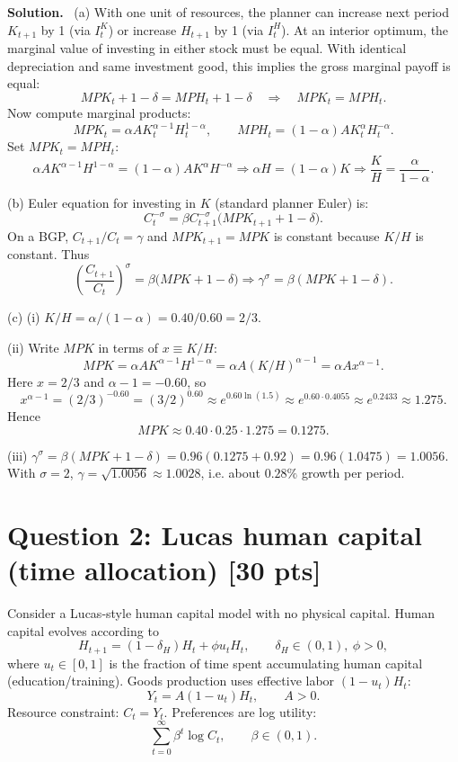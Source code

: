 \documentclass[12pt]{article}
\newenvironment{sol}{\par\medskip\noindent\textbf{Solution.}\ }{\par\medskip}
\newcommand{\pts}[1]{\hfill{\small[#1 pts]}}
\begin{document}
\begin{sol}
(a) With one unit of resources, the planner can increase next period \(K_{t+1}\) by 1 (via \(I^K_t\)) or increase \(H_{t+1}\) by 1 (via \(I^H_t\)).
At an interior optimum, the marginal value of investing in either stock must be equal.
With identical depreciation and same investment good, this implies the gross marginal payoff is equal:
\[
MPK_t + 1-\delta = MPH_t + 1-\delta \quad\Rightarrow\quad MPK_t=MPH_t.
\]
Now compute marginal products:
\[
MPK_t = \alpha A K_t^{\alpha-1}H_t^{1-\alpha},\qquad
MPH_t = (1-\alpha)A K_t^{\alpha}H_t^{-\alpha}.
\]
Set \(MPK_t=MPH_t\):
\[
\alpha A K^{\alpha-1}H^{1-\alpha}=(1-\alpha)A K^\alpha H^{-\alpha}
\Rightarrow \alpha H = (1-\alpha)K
\Rightarrow \frac{K}{H}=\frac{\alpha}{1-\alpha}.
\]

(b) Euler equation for investing in \(K\) (standard planner Euler) is:
\[
C_t^{-\sigma} = \beta C_{t+1}^{-\sigma}\big(MPK_{t+1}+1-\delta\big).
\]
On a BGP, \(C_{t+1}/C_t=\gamma\) and \(MPK_{t+1}=MPK\) is constant because \(K/H\) is constant.
Thus
\[
\left(\frac{C_{t+1}}{C_t}\right)^\sigma = \beta\big(MPK+1-\delta\big)
\Rightarrow \gamma^\sigma = \beta(MPK+1-\delta).
\]

(c)
(i) \(K/H=\alpha/(1-\alpha)=0.40/0.60=2/3\).

(ii) Write \(MPK\) in terms of \(x\equiv K/H\):
\[
MPK = \alpha A K^{\alpha-1}H^{1-\alpha}
= \alpha A (K/H)^{\alpha-1}
= \alpha A x^{\alpha-1}.
\]
Here \(x=2/3\) and \(\alpha-1=-0.60\), so
\[
x^{\alpha-1}=(2/3)^{-0.60}=(3/2)^{0.60}\approx e^{0.60\ln(1.5)}\approx e^{0.60\cdot 0.4055}\approx e^{0.2433}\approx 1.275.
\]
Hence
\[
MPK \approx 0.40\cdot 0.25 \cdot 1.275 = 0.1275.
\]

(iii) \(\gamma^\sigma=\beta(MPK+1-\delta)=0.96(0.1275+0.92)=0.96(1.0475)=1.0056\).
With \(\sigma=2\), \(\gamma=\sqrt{1.0056}\approx 1.0028\), i.e. about \(0.28\%\) growth per period.
\end{sol}

\section*{Question 2: Lucas human capital (time allocation) \pts{30}}

Consider a Lucas-style human capital model with no physical capital.
Human capital evolves according to
\[
H_{t+1} = (1-\delta_H)H_t + \phi u_t H_t,
\qquad \delta_H\in(0,1),\ \phi>0,
\]
where \(u_t\in[0,1]\) is the fraction of time spent accumulating human capital (education/training).
Goods production uses effective labor \((1-u_t)H_t\):
\[
Y_t = A(1-u_t)H_t,\qquad A>0.
\]
Resource constraint: \(C_t=Y_t\).
Preferences are log utility:
\[
\sum_{t=0}^{\infty}\beta^t \log C_t,\qquad \beta\in(0,1).
\]
\end{document}
